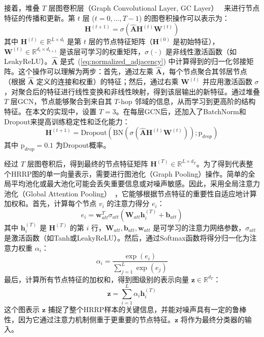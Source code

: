 接着，堆叠 $T$ 层图卷积层（Graph Convolutional Layer, GC Layer）~\cite{kipf_semi-supervised_2017} 来进行节点特征的传播和更新。第 $t$ 层 ($t=0, \dots, T-1$) 的图卷积操作可以表示为：
\begin{equation}
    \mathbf{H}^{(t+1)} = \sigma\left(\hat{\mathbf{A}} \mathbf{H}^{(t)} \mathbf{W}^{(t)}\right)
    \label{eq:gcn_layer}
\end{equation}
其中 $\mathbf{H}^{(t)} \in \mathbb{R}^{L \times d_t}$ 是第 $t$ 层的节点特征矩阵（$\mathbf{H}^{(0)}$ 是初始特征），$\mathbf{W}^{(t)} \in \mathbb{R}^{d_t \times d_{t+1}}$ 是该层可学习的权重矩阵，$\sigma(\cdot)$ 是非线性激活函数（如LeakyReLU）。$\hat{\mathbf{A}}$ 是式~(\ref{eq:normalized_adjacency}) 中计算得到的归一化邻接矩阵。这个操作可以理解为两步：首先，通过左乘 $\hat{\mathbf{A}}$，每个节点聚合其邻居节点（根据 $\hat{\mathbf{A}}$ 定义的连接和权重）的特征；然后，通过右乘 $\mathbf{W}^{(t)}$ 并应用激活函数 $\sigma$，对聚合后的特征进行线性变换和非线性映射，得到该层输出的新特征。通过堆叠 $T$ 层GCN，节点能够聚合到来自其 $T$-hop 邻域的信息，从而学习到更高阶的结构特征。在本文的实现中，设置 $T=3$。在每层GCN后，还加入了BatchNorm和Dropout来提高训练稳定性和泛化能力：
\begin{equation}
    \mathbf{H}^{(t+1)} = \text{Dropout}\left(\text{BN}\left(\sigma\left(\hat{\mathbf{A}} \mathbf{H}^{(t)} \mathbf{W}^{(t)}\right)\right); \text{p}_{drop}\right)
    \label{eq:gcn_layer_full}
\end{equation}
其中 $\text{p}_{drop}=0.1$ 为Dropout概率。

经过 $T$ 层图卷积后，得到最终的节点特征矩阵 $\mathbf{H}^{(T)} \in \mathbb{R}^{L \times d_T}$。为了得到代表整个HRRP图的单一向量表示，需要进行图池化（Graph Pooling）操作。简单的全局平均池化或最大池化可能会丢失重要信息或对噪声敏感。因此，采用全局注意力池化（Global Attention Pooling）~，它能够根据节点特征的重要性自适应地计算加权和。首先，计算每个节点 $v_i$ 的注意力得分 $e_i$：
\begin{equation}
    e_i = \mathbf{w}_{att}^T \sigma_{att}(\mathbf{W}_{att} \mathbf{h}_i^{(T)} + \mathbf{b}_{att})
    \label{eq:attention_score_node}
\end{equation}
其中 $\mathbf{h}_i^{(T)}$ 是 $\mathbf{H}^{(T)}$ 的第 $i$ 行，$\mathbf{W}_{att}, \mathbf{b}_{att}, \mathbf{w}_{att}$ 是可学习的注意力网络参数，$\sigma_{att}$ 是激活函数（如Tanh或LeakyReLU）。然后，通过Softmax函数将得分归一化为注意力权重 $\alpha_i$：
\begin{equation}
    \alpha_i = \frac{\exp(e_i)}{\sum_{j=1}^L \exp(e_j)}
    \label{eq:attention_weight_node}
\end{equation}
最后，计算所有节点特征的加权和，得到图级别的表示向量 $\mathbf{z} \in \mathbb{R}^{d_T}$：
\begin{equation}
    \mathbf{z} = \sum_{i=1}^L \alpha_i \mathbf{h}_i^{(T)}
    \label{eq:graph_representation}
\end{equation}
这个图表示 $\mathbf{z}$ 捕捉了整个HRRP样本的关键信息，并能对噪声具有一定的鲁棒性，因为它通过注意力机制侧重于更重要的节点特征。$\mathbf{z}$ 将作为最终分类器的输入。


